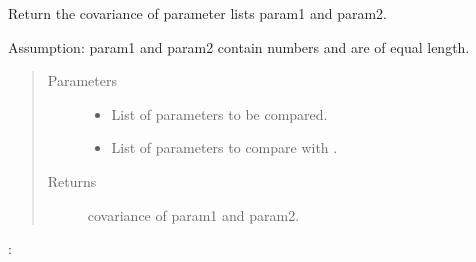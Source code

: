 \documentclass[letterpaper,10pt,english]{sphinxmanual}
\begin{document}
\begin{fulllineitems}
\begin{fulllineitems}
\end{fulllineitems}


\begin{fulllineitems}
\label{\detokenize{AssignmentPCA:AssignmentPCA.AssignmentPCA.covariance}}
\sphinxAtStartPar
Return the covariance of parameter lists param1 and param2.

\sphinxAtStartPar
Assumption: param1 and param2 contain numbers and are of equal length.
\begin{quote}\begin{description}
\item[{Parameters}] \leavevmode\begin{itemize}
\item {} 
\sphinxAtStartPar
{} \sphinxhyphen{}\sphinxhyphen{} List of parameters to be compared.

\item {} 
\sphinxAtStartPar
{} \sphinxhyphen{}\sphinxhyphen{} List of parameters to compare with .

\end{itemize}

\item[{Returns}] \leavevmode
\sphinxAtStartPar
covariance of param1 and param2.

\end{description}\end{quote}

\begin{sphinxVerbatim}[commandchars=\\\{\}]
\PYG{p}{[}     \PYG{p}{]} \PYG{p}{[}     \PYG{p}{]}
\PYG{p}{[}\PYG{p}{]} \PYG{p}{[} \PYG{p}{]}
: 
\end{sphinxVerbatim}


\end{fulllineitems}
\end{fulllineitems}
\end{document}
